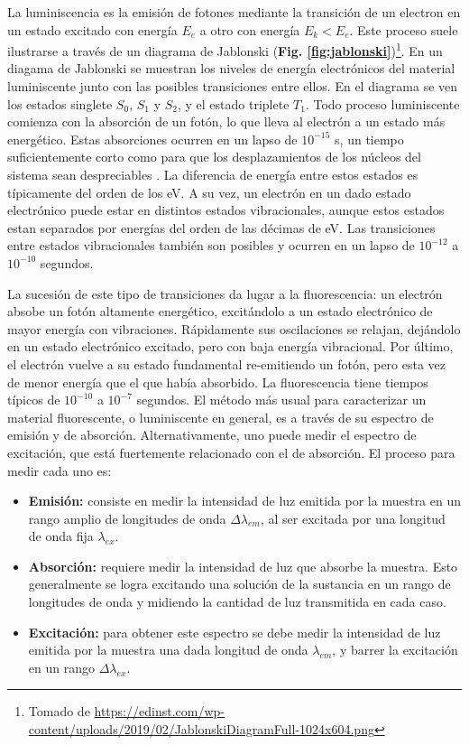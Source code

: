 La luminiscencia es la emisión de fotones mediante la transición de un electron en un estado excitado con energía $E_e$ a otro con energía $E_k < E_e$.
Este proceso suele ilustrarse a través de un diagrama de Jablonski (\textbf{Fig. \ref{fig:jablonski}})\footnote{Tomado de \href{https://edinst.com/wp-content/uploads/2019/02/JablonskiDiagramFull-1024x604.png}{https://edinst.com/wp-content/uploads/2019/02/JablonskiDiagramFull-1024x604.png}}.
En un diagama de Jablonski se muestran los niveles de energía electrónicos del material luminiscente junto con las posibles transiciones entre ellos.
En el diagrama se ven los estados singlete $S_0$, $S_1$ y $S_2$, y el estado triplete $T_1$.
Todo proceso luminiscente comienza con la absorción de un fotón, lo que lleva al electrón a un estado más energético.
Estas absorciones ocurren en un lapso de $10^{-15}$ s, un tiempo suficientemente corto como para que los desplazamientos de los núcleos del sistema sean despreciables \cite{lakowicz_principles_2006}.
La diferencia de energía entre estos estados es típicamente del orden de los eV.
A su vez, un electrón en un dado estado electrónico puede estar en distintos estados vibracionales, aunque estos estados estan separados por energías del orden de las décimas de eV.
Las transiciones entre estados vibracionales también son posibles y ocurren en un lapso de $10^{-12}$ a $10^{-10}$ segundos.

La sucesión de este tipo de transiciones da lugar a la fluorescencia: un electrón absobe un fotón altamente energético, excitándolo a un estado electrónico de mayor energía con vibraciones.
Rápidamente sus oscilaciones se relajan, dejándolo en un estado electrónico excitado, pero con baja energía vibracional.
Por último, el electrón vuelve a su estado fundamental re-emitiendo un fotón, pero esta vez de menor energía que el que había absorbido.
La fluorescencia tiene tiempos típicos de $10^{-10}$ a $10^{-7}$ segundos.
El método más usual para caracterizar un material fluorescente, o luminiscente en general, es a través de su espectro de emisión y de absorción.
Alternativamente, uno puede medir el espectro de excitación, que está fuertemente relacionado con el de absorción.
El proceso para medir cada uno es:

\begin{itemize}
    \item \textbf{Emisión:} consiste en medir la intensidad de luz emitida por la muestra en un rango amplio de longitudes de onda $\Delta \lambda_{em}$, al ser excitada por una longitud de onda fija $\lambda_{ex}$.
    \item \textbf{Absorción:} requiere medir la intensidad de luz que absorbe la muestra. Esto generalmente se logra excitando una solución de la sustancia en un rango de longitudes de onda y midiendo la cantidad de luz transmitida en cada caso.
    \item \textbf{Excitación:} para obtener este espectro se debe medir la intensidad de luz emitida por la muestra una dada longitud de onda $\lambda_{em}$, y barrer la excitación en un rango $\Delta \lambda_{ex}$.
\end{itemize}


